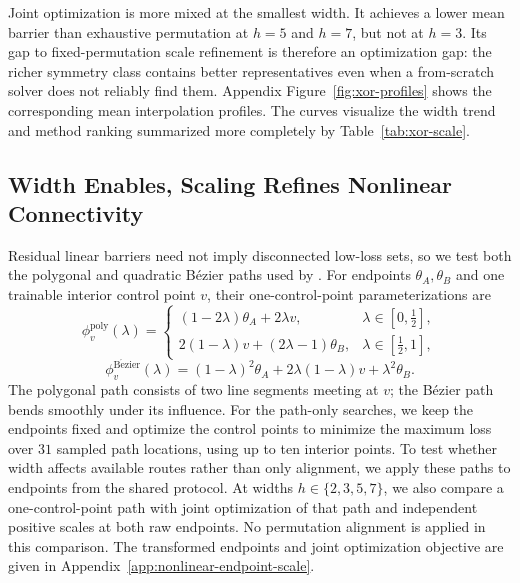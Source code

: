 \documentclass[twoside]{article}
\begin{document}
Joint optimization is more mixed at the smallest width.  It achieves a lower
mean barrier than exhaustive permutation at $h=5$ and $h=7$, but not at $h=3$.
Its gap to fixed-permutation scale refinement is therefore an optimization gap:
the richer symmetry class contains better representatives even when a
from-scratch solver does not reliably find them.
Appendix Figure~\ref{fig:xor-profiles} shows the corresponding mean
interpolation profiles.  The curves visualize the width trend and method
ranking summarized more completely by Table~\ref{tab:xor-scale}.

\subsection{Width Enables, Scaling Refines Nonlinear Connectivity}
\label{sec:nonlinear}

Residual linear barriers need not imply disconnected low-loss sets, so we test
both the polygonal and quadratic B\'ezier paths used by
\citet{garipov2018loss}.  For endpoints $\theta_A,\theta_B$ and one trainable
interior control point $v$, their one-control-point parameterizations are
\begin{equation}
\phi^{\mathrm{poly}}_{v}(\lambda)=
\begin{cases}
(1-2\lambda)\theta_A+2\lambda v,
    & \lambda\in[0,\tfrac12],\\
2(1-\lambda)v+(2\lambda-1)\theta_B,
    & \lambda\in[\tfrac12,1],
\end{cases}
\label{eq:polygonal-path}
\end{equation}
\begin{equation}
\phi^{\mathrm{B\acute ezier}}_{v}(\lambda)
=(1-\lambda)^2\theta_A+2\lambda(1-\lambda)v+\lambda^2\theta_B.
\label{eq:bezier-path}
\end{equation}
The polygonal path consists of two line segments meeting at $v$; the B\'ezier
path bends smoothly under its influence.  For the path-only searches, we keep
the endpoints fixed and optimize the control points to minimize the maximum
loss over $31$ sampled path locations, using up to ten interior points.  To
test whether width affects available routes rather than only alignment, we
apply these paths to endpoints from the shared protocol.  At widths
$h\in\{2,3,5,7\}$, we also compare a one-control-point path with joint
optimization of that path and independent positive scales at both raw
endpoints.  No permutation alignment is applied in this comparison.  The
transformed endpoints and joint optimization objective are given in
Appendix~\ref{app:nonlinear-endpoint-scale}.
\end{document}
